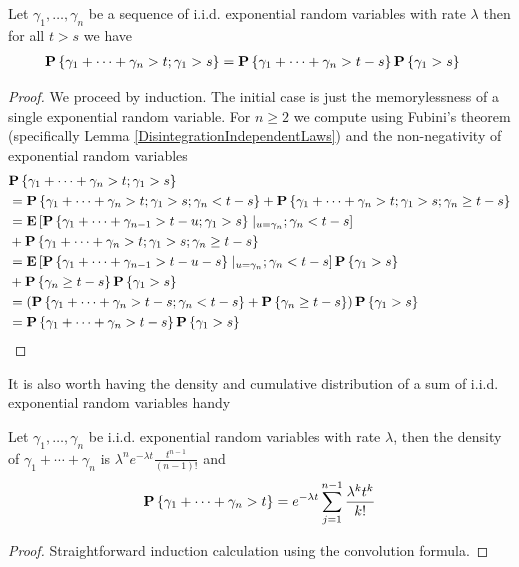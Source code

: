 \begin{prop}\label{SumOfExponentialMemoryless}Let $\gamma_1, \dotsc, \gamma_n$ be a sequence of
  i.i.d. exponential random variables with rate $\lambda$ then for all
  $t > s$ we have
\begin{align*}
\textbf{P}\left \{\gamma_1 +\dotsb + \gamma_n > t; \gamma_1 > s \right \} &=
\textbf{P}\left \{\gamma_1 +\dotsb + \gamma_n > t-s \right \} \textbf{P}\left \{\gamma_1 > s \right \} 
\end{align*}
\end{prop}
\begin{proof}
We proceed by induction.  The initial case is just the memorylessness
of a single exponential random variable.  For $n \geq 2$ we compute using Fubini's theorem (specifically Lemma
\ref{DisintegrationIndependentLaws}) and the non-negativity of
exponential random variables
\begin{align*}
&\textbf{P}\left \{\gamma_1 + \dotsb + \gamma_n > t ; \gamma_1 > s \right \} \\
&= \textbf{P}\left \{\gamma_1 + \dotsb + \gamma_n > t ; \gamma_1 > s;
  \gamma_n < t-s \right \} + \textbf{P}\left \{\gamma_1 + \dotsb + \gamma_n > t ; \gamma_1 > s;
  \gamma_n \geq t-s \right \}  \\
&= \textbf{E}\left[\textbf{P}\left \{\gamma_1 + \dotsb + \gamma_{n-1} > t-u ;
    \gamma_1 > s \right \} \mid_{u = \gamma_n} ;
  \gamma_n < t-s\right] \\
&+ \textbf{P}\left \{\gamma_1 + \dotsb + \gamma_n > t ; \gamma_1 > s;
  \gamma_n \geq t-s \right \}  \\
&= \textbf{E}\left[\textbf{P}\left \{\gamma_1 + \dotsb + \gamma_{n-1} > t-u-s \right \}
  \mid_{u = \gamma_n} ; 
  \gamma_n < t-s\right] \textbf{P}\left \{\gamma_1 > s \right \} \\
&+ \textbf{P}\left \{\gamma_n \geq t-s \right \} \textbf{P}\left \{\gamma_1 > s \right \} \\
&= \left(\textbf{P}\left \{\gamma_1 + \dotsb + \gamma_{n} > t-s;  \gamma_n < t-s \right \}
+ \textbf{P}\left \{\gamma_n \geq t-s \right \} \right) \textbf{P}\left \{\gamma_1 > s \right \} \\
&= \textbf{P}\left \{\gamma_1 + \dotsb + \gamma_{n} > t-s \right \}\textbf{P}\left \{\gamma_1 > s \right \} 
\end{align*}
\end{proof}

It is also worth having the density and cumulative distribution of a
sum of i.i.d. exponential random variables handy
\begin{prop}Let $\gamma_1, \dotsc, \gamma_n$ be i.i.d. exponential
  random variables with rate $\lambda$, then the density of $\gamma_1
  + \dotsb + \gamma_n$ is $\lambda^n e^{-\lambda t}
  \frac{t^{n-1}}{(n-1)!}$ and 
\begin{align*}
\textbf{P}\left \{\gamma_1 + \dotsb + \gamma_n > t \right \} = e^{-\lambda t}
\sum_{j=1}^{n-1} \frac{\lambda^k t^k}{k!}
\end{align*}
\end{prop}
\begin{proof}
Straightforward induction calculation using the convolution formula.
\end{proof}

